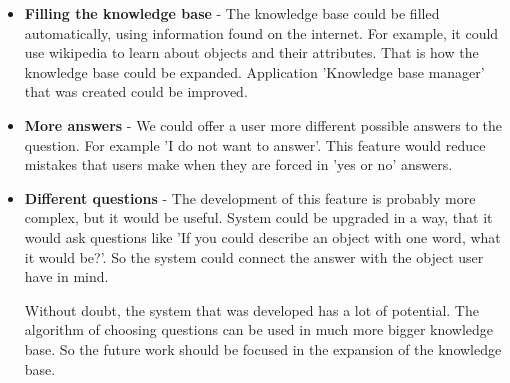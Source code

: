 \documentclass[a4paper]{article}
\begin{document}
\begin{itemize}
\item \textbf{Filling the knowledge base} - The knowledge base could be filled automatically, using information found on the internet. For example, it could use wikipedia to learn about objects and their attributes. That is how the knowledge base could be expanded. Application 'Knowledge base manager' that was created could be improved. 

\item \textbf{More answers} - We could offer a user more different possible answers to the question. For example 'I do not want to answer'. This feature would reduce mistakes that users make when they are forced in 'yes or no' answers.

\item \textbf{Different questions} - The development of this feature is probably more complex, but it would be useful. System could be upgraded in a way, that it would ask questions like 'If you could describe an object with one word, what it would be?'. So the system could connect the answer with the object user have in mind.

Without doubt, the system that was developed has a lot of potential. The algorithm of choosing questions can be used in much more bigger knowledge base. So the future work should be focused in the expansion of the knowledge base. 

\end{itemize}
\end{document}
